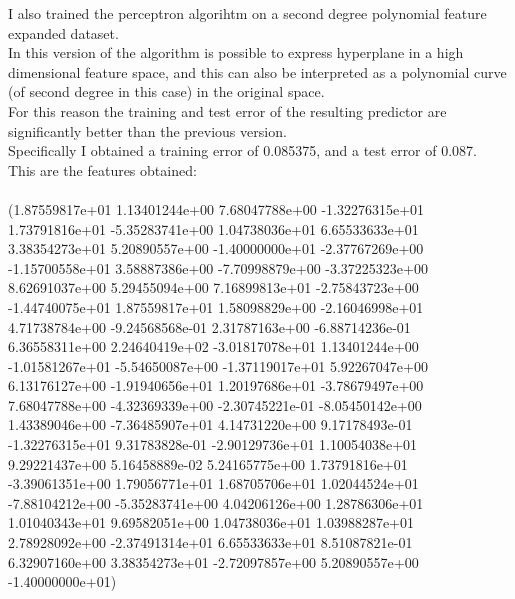 I also trained the perceptron algorihtm on a second degree polynomial feature expanded dataset.\\
In this version of the algorithm is possible to express hyperplane in a high dimensional feature space, and this can also be interpreted as a polynomial curve (of second degree in this case) in the original space.\\
For this reason the training and test error of the resulting predictor are significantly better than the previous version.\\
Specifically I obtained a training error of 0.085375, and a test error of 0.087.\\
This are the features obtained:\\\\
(1.87559817e+01  1.13401244e+00  7.68047788e+00 -1.32276315e+01\\
  1.73791816e+01 -5.35283741e+00  1.04738036e+01  6.65533633e+01\\
  3.38354273e+01  5.20890557e+00 -1.40000000e+01 -2.37767269e+00\\
 -1.15700558e+01  3.58887386e+00 -7.70998879e+00 -3.37225323e+00\\
  8.62691037e+00  5.29455094e+00  7.16899813e+01 -2.75843723e+00\\
 -1.44740075e+01  1.87559817e+01  1.58098829e+00 -2.16046998e+01\\
  4.71738784e+00 -9.24568568e-01  2.31787163e+00 -6.88714236e-01\\
  6.36558311e+00  2.24640419e+02 -3.01817078e+01  1.13401244e+00\\
 -1.01581267e+01 -5.54650087e+00 -1.37119017e+01  5.92267047e+00\\
  6.13176127e+00 -1.91940656e+01  1.20197686e+01 -3.78679497e+00\\
  7.68047788e+00 -4.32369339e+00 -2.30745221e-01 -8.05450142e+00\\
  1.43389046e+00 -7.36485907e+01  4.14731220e+00  9.17178493e-01\\
 -1.32276315e+01  9.31783828e-01 -2.90129736e+01  1.10054038e+01\\
  9.29221437e+00  5.16458889e-02  5.24165775e+00  1.73791816e+01\\
 -3.39061351e+00  1.79056771e+01  1.68705706e+01  1.02044524e+01\\
 -7.88104212e+00 -5.35283741e+00  4.04206126e+00  1.28786306e+01\\
  1.01040343e+01  9.69582051e+00  1.04738036e+01  1.03988287e+01\\
  2.78928092e+00 -2.37491314e+01  6.65533633e+01  8.51087821e-01\\
  6.32907160e+00  3.38354273e+01 -2.72097857e+00  5.20890557e+00\\
 -1.40000000e+01) \\